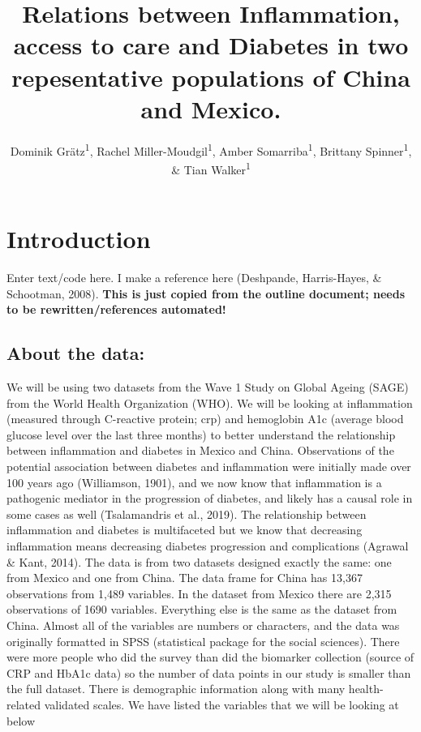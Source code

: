\documentclass[
  man,floatsintext]{apa6}
\title{Relations between Inflammation, access to care and Diabetes in two repesentative populations of China and Mexico.}
\author{Dominik Grätz\textsuperscript{1}, Rachel Miller-Moudgil\textsuperscript{1}, Amber Somarriba\textsuperscript{1}, Brittany Spinner\textsuperscript{1}, \& Tian Walker\textsuperscript{1}}
\date{}
\affiliation{\vspace{0.5cm}\textsuperscript{1} University of Oregon}
\begin{document}
\maketitle

\hypertarget{introduction}{%
\section{Introduction}\label{introduction}}

Enter text/code here. I make a reference here (Deshpande, Harris-Hayes, \& Schootman, 2008).
\textbf{This is just copied from the outline document; needs to be rewritten/references automated!}

\hypertarget{about-the-data}{%
\subsection{About the data:}\label{about-the-data}}

We will be using two datasets from the Wave 1 Study on Global Ageing (SAGE) from the World Health Organization (WHO). We will be looking at inflammation (measured through C-reactive protein; crp) and hemoglobin A1c (average blood glucose level over the last three months) to better understand the relationship between inflammation and diabetes in Mexico and China. Observations of the potential association between diabetes and inflammation were initially made over 100 years ago (Williamson, 1901), and we now know that inflammation is a pathogenic mediator in the progression of diabetes, and likely has a causal role in some cases as well (Tsalamandris et al., 2019). The relationship between inflammation and diabetes is multifaceted but we know that decreasing inflammation means decreasing diabetes progression and complications (Agrawal \& Kant, 2014).
The data is from two datasets designed exactly the same: one from Mexico and one from China. The data frame for China has 13,367 observations from 1,489 variables. In the dataset from Mexico there are 2,315 observations of 1690 variables. Everything else is the same as the dataset from China. Almost all of the variables are numbers or characters, and the data was originally formatted in SPSS (statistical package for the social sciences). There were more people who did the survey than did the biomarker collection (source of CRP and HbA1c data) so the number of data points in our study is smaller than the full dataset. There is demographic information along with many health-related validated scales. We have listed the variables that we will be looking at below
\end{document}
